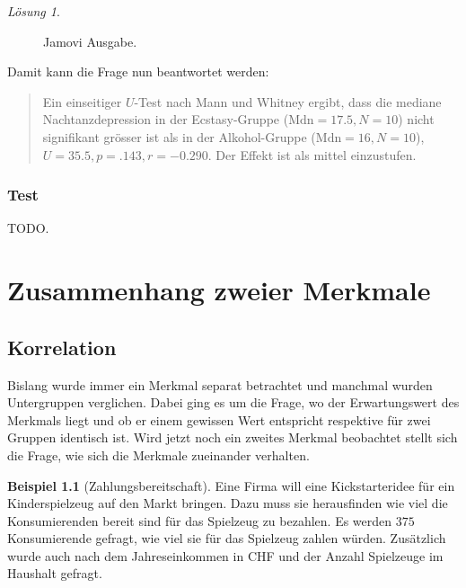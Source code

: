 \documentclass[
]{book}
\theoremstyle{definition}
\theoremstyle{definition}
\newtheorem{example}{Beispiel}[chapter]
\theoremstyle{definition}
\theoremstyle{definition}
\theoremstyle{remark}
\newtheorem*{solution}{Lösung}
\begin{document}
\begin{solution}
\begin{figure}
{}

\caption{Jamovi Ausgabe.}\label{fig:sol-depression-ecstasy-output}
\end{figure}

Damit kann die Frage nun beantwortet werden:

\begin{quote}
Ein einseitiger \(U\)-Test nach Mann und Whitney ergibt, dass die
mediane Nachtanzdepression in der Ecstasy-Gruppe
(\(\text{Mdn}=17.5, N = 10\)) nicht signifikant grösser ist als in der
Alkohol-Gruppe (\(\text{Mdn}= 16, N =10\)),
\(U = 35.5, p = .143, r = -0.290\). Der Effekt ist als mittel
einzustufen.
\end{quote}

\end{solution}

\section{Test}\label{test-3}

TODO.

\part{Zusammenhang zweier Merkmale}\label{part-zusammenhang-zweier-merkmale}

\chapter{Korrelation}\label{korrelation}

Bislang wurde immer ein Merkmal separat betrachtet und manchmal wurden Untergruppen verglichen. Dabei ging es um die Frage, wo der Erwartungswert des Merkmals liegt und ob er einem gewissen Wert entspricht respektive für zwei Gruppen identisch ist. Wird jetzt noch ein zweites Merkmal beobachtet stellt sich die Frage, wie sich die Merkmale zueinander verhalten.

\begin{example}[Zahlungsbereitschaft]
\protect\hypertarget{exm:zahlungsbereitschaft}{}\label{exm:zahlungsbereitschaft}Eine Firma will eine Kickstarteridee für ein Kinderspielzeug auf den Markt bringen. Dazu muss sie herausfinden wie viel die Konsumierenden bereit sind für das Spielzeug zu bezahlen. Es werden \(375\) Konsumierende gefragt, wie viel sie für das Spielzeug zahlen würden. Zusätzlich wurde auch nach dem Jahreseinkommen in CHF und der Anzahl Spielzeuge im Haushalt gefragt.
\end{example}
\end{document}
